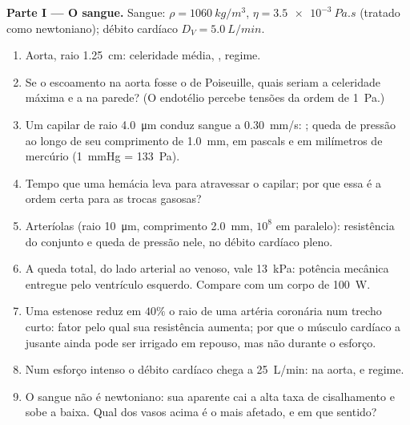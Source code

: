 \begin{problem}
\medskip
\noindent\textbf{Parte I --- O sangue.}
Sangue: $\rho = \qty{1060}{kg/m^3}$, $\eta = \qty{3.5e-3}{Pa.s}$ (tratado como
newtoniano); débito cardíaco $D_V = \qty{5.0}{L/min}$.
\begin{enumerate}
  \item Aorta, raio \qty{1.25}{cm}: celeridade média, , regime.
  \item Se o escoamento na aorta fosse o de Poiseuille, quais seriam a
        celeridade máxima e a  na parede? (O endotélio
        percebe tensões da ordem de \qty{1}{Pa}.)
  \item Um capilar de raio \qty{4.0}{\micro m} conduz sangue a
        \qty{0.30}{mm/s}: ; queda de pressão ao longo de seu
        comprimento de \qty{1.0}{mm}, em pascals e em milímetros de mercúrio
        (\qty{1}{mmHg} = \qty{133}{Pa}).
  \item Tempo que uma hemácia leva para atravessar o capilar; por que essa é a
        ordem certa para as trocas gasosas?
  \item Arteríolas (raio \qty{10}{\micro m}, comprimento \qty{2.0}{mm}, $10^8$
        em paralelo): resistência do conjunto e queda de pressão
        nele, no débito cardíaco pleno.
  \item A queda total, do lado arterial ao venoso, vale \qty{13}{kPa}: potência
        mecânica entregue pelo ventrículo esquerdo. Compare com um
        corpo de \qty{100}{W}.
  \item Uma estenose reduz em $40\%$ o raio de uma artéria coronária
        num trecho curto: fator pelo qual sua resistência aumenta; por que
        o músculo cardíaco a jusante ainda pode ser irrigado em repouso, mas
        não durante o esforço.
  \item Num esforço intenso o débito cardíaco chega a \qty{25}{L/min}:
         na aorta, e regime.
  \item O sangue não é newtoniano: sua  aparente cai a alta
        taxa de cisalhamento e sobe a baixa. Qual dos vasos acima é
        o mais afetado, e em que sentido?
\end{enumerate}


\end{problem}
